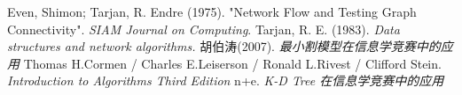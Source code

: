 \begin{thebibliography}{999}
	 Even, Shimon; Tarjan, R. Endre (1975).
	"Network Flow and Testing Graph Connectivity".
    \emph{SIAM Journal on Computing}.
     Tarjan, R. E. (1983).
    \emph{Data structures and network algorithms.}
    胡伯涛(2007). \emph{最小割模型在信息学竞赛中的应用}
      Thomas H.Cormen / Charles E.Leiserson /
     Ronald L.Rivest / Clifford Stein.
     \emph{Introduction to Algorithms Third Edition}
    n+e. \emph{K-D Tree 在信息学竞赛中的应用}
\end{thebibliography}
